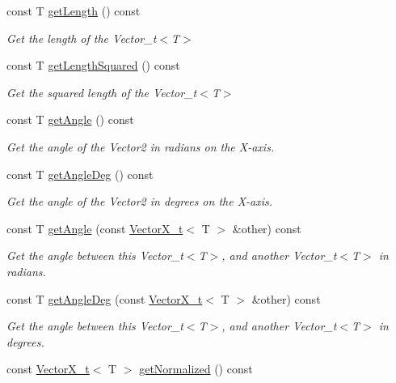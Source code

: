 \begin{DoxyCompactItemize}
const T \hyperlink{class_vector_x__t_aa1548451f4620694a671d9b15be69ba2}{get\+Length} () const
\begin{DoxyCompactList}\small\item\em Get the length of the Vector\+\_\+t$<$\+T$>$ \end{DoxyCompactList}\item 
const T \hyperlink{class_vector_x__t_a2b6ed2553246864a1f903619de4e0786}{get\+Length\+Squared} () const
\begin{DoxyCompactList}\small\item\em Get the squared length of the Vector\+\_\+t$<$\+T$>$ \end{DoxyCompactList}\item 
const T \hyperlink{class_vector_x__t_a7e497c0abad76724767e78644ff91e35}{get\+Angle} () const
\begin{DoxyCompactList}\small\item\em Get the angle of the Vector2 in radians on the X-\/axis. \end{DoxyCompactList}\item 
const T \hyperlink{class_vector_x__t_abdee14870829077f912a2e5b85ceb51a}{get\+Angle\+Deg} () const
\begin{DoxyCompactList}\small\item\em Get the angle of the Vector2 in degrees on the X-\/axis. \end{DoxyCompactList}\item 
const T \hyperlink{class_vector_x__t_a875b1e98058eafffead7e4a0e39496f9}{get\+Angle} (const \hyperlink{class_vector_x__t}{Vector\+X\+\_\+t}$<$ T $>$ \&other) const
\begin{DoxyCompactList}\small\item\em Get the angle between this Vector\+\_\+t$<$\+T$>$, and another Vector\+\_\+t$<$\+T$>$ in radians. \end{DoxyCompactList}\item 
const T \hyperlink{class_vector_x__t_a936a9063f46982c8837b88c6a16526bf}{get\+Angle\+Deg} (const \hyperlink{class_vector_x__t}{Vector\+X\+\_\+t}$<$ T $>$ \&other) const
\begin{DoxyCompactList}\small\item\em Get the angle between this Vector\+\_\+t$<$\+T$>$, and another Vector\+\_\+t$<$\+T$>$ in degrees. \end{DoxyCompactList}\item 
const \hyperlink{class_vector_x__t}{Vector\+X\+\_\+t}$<$ T $>$ \hyperlink{class_vector_x__t_af977e73b4611bededc322a113ad2b523}{get\+Normalized} () const

\end{DoxyCompactItemize}
